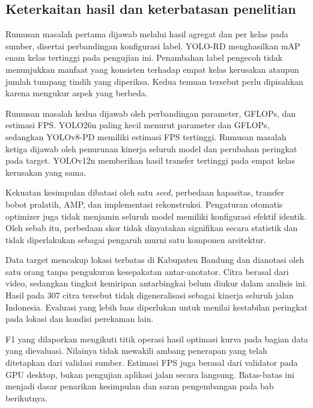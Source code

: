 \subsection{Keterkaitan hasil dan keterbatasan penelitian}
Rumusan masalah pertama dijawab melalui hasil agregat dan per kelas pada sumber, disertai perbandingan konfigurasi label. YOLO-RD menghasilkan mAP enam kelas tertinggi pada pengujian ini. Penambahan label pengecoh tidak menunjukkan manfaat yang konsisten terhadap empat kelas kerusakan ataupun jumlah tumpang tindih yang diperiksa. Kedua temuan tersebut perlu dipisahkan karena mengukur aspek yang berbeda.

Rumusan masalah kedua dijawab oleh perbandingan parameter, GFLOPs, dan estimasi FPS. YOLO26n paling kecil menurut parameter dan GFLOPs, sedangkan YOLOv8-PD memiliki estimasi FPS tertinggi. Rumusan masalah ketiga dijawab oleh penurunan kinerja seluruh model dan perubahan peringkat pada target. YOLOv12n memberikan hasil transfer tertinggi pada empat kelas kerusakan yang sama.

Kekuatan kesimpulan dibatasi oleh satu \textit{seed}, perbedaan kapasitas, transfer bobot pralatih, AMP, dan implementasi rekonstruksi. Pengaturan otomatis optimizer juga tidak menjamin seluruh model memiliki konfigurasi efektif identik. Oleh sebab itu, perbedaan skor tidak dinyatakan signifikan secara statistik dan tidak diperlakukan sebagai pengaruh murni satu komponen arsitektur.

Data target mencakup lokasi terbatas di Kabupaten Bandung dan dianotasi oleh satu orang tanpa pengukuran kesepakatan antar-anotator. Citra berasal dari video, sedangkan tingkat kemiripan antarbingkai belum diukur dalam analisis ini. Hasil pada 307 citra tersebut tidak digeneralisasi sebagai kinerja seluruh jalan Indonesia. Evaluasi yang lebih luas diperlukan untuk menilai kestabilan peringkat pada lokasi dan kondisi perekaman lain.

F1 yang dilaporkan mengikuti titik operasi hasil optimasi kurva pada bagian data yang dievaluasi. Nilainya tidak mewakili ambang penerapan yang telah ditetapkan dari validasi sumber. Estimasi FPS juga berasal dari validator pada GPU desktop, bukan pengujian aplikasi jalan secara langsung. Batas-batas ini menjadi dasar penarikan kesimpulan dan saran pengembangan pada bab berikutnya.
